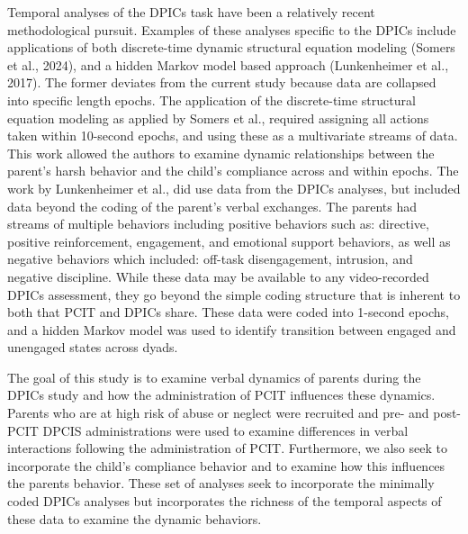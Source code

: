 \documentclass[12pt]{./styles/outhesis}
\begin{document}
Temporal analyses of the DPICs task have been a relatively recent
methodological pursuit. Examples of these analyses specific to the DPICs
include applications of both discrete-time dynamic structural equation
modeling (Somers et al., 2024), and a hidden Markov model based approach
(Lunkenheimer et al., 2017). The former deviates from the current study
because data are collapsed into specific length epochs. The application
of the discrete-time structural equation modeling as applied by Somers
et al., required assigning all actions taken within 10-second epochs,
and using these as a multivariate streams of data. This work allowed the
authors to examine dynamic relationships between the parent's harsh
behavior and the child's compliance across and within epochs. The work
by Lunkenheimer et al., did use data from the DPICs analyses, but
included data beyond the coding of the parent's verbal exchanges. The
parents had streams of multiple behaviors including positive behaviors
such as: directive, positive reinforcement, engagement, and emotional
support behaviors, as well as negative behaviors which included:
off-task disengagement, intrusion, and negative discipline. While these
data may be available to any video-recorded DPICs assessment, they go
beyond the simple coding structure that is inherent to both that PCIT
and DPICs share. These data were coded into 1-second epochs, and a
hidden Markov model was used to identify transition between engaged and
unengaged states across dyads.

The goal of this study is to examine verbal dynamics of parents during
the DPICs study and how the administration of PCIT influences these
dynamics. Parents who are at high risk of abuse or neglect were
recruited and pre- and post-PCIT DPCIS administrations were used to
examine differences in verbal interactions following the administration
of PCIT. Furthermore, we also seek to incorporate the child's compliance
behavior and to examine how this influences the parents behavior. These
set of analyses seek to incorporate the minimally coded DPICs analyses
but incorporates the richness of the temporal aspects of these data to
examine the dynamic behaviors.   
\end{document}
